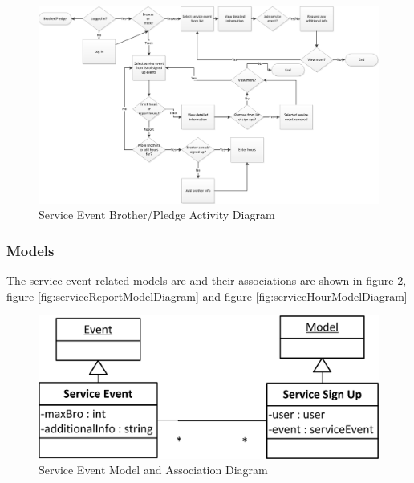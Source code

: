 \documentclass{article}
\begin{document}
\FloatBarrier
\begin{figure}
\centering
\includegraphics[scale=.65]{img/activityDiagrams/serviceEventActivity2}
\caption{Service Event Brother/Pledge Activity Diagram}
\label{fig:serviceEventBrotherActivityDiagram}
\end{figure}
\FloatBarrier

\subsubsection{Models}

The service event related models are and their associations are shown in figure \ref{fig:serviceEventModelDiagram}, figure \ref{fig:serviceReportModelDiagram} and figure \ref{fig:serviceHourModelDiagram}

\FloatBarrier
\begin{figure}[h!]
\centering
\includegraphics[scale=.65]{img/modelDiagrams/serviceEventModel}
\caption{Service Event Model and Association Diagram}
\label{fig:serviceEventModelDiagram}
\end{figure}
\FloatBarrier
\end{document}

